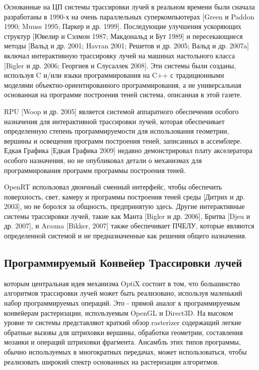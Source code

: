  Основанные на ЦП системы трассировки лучей в реальном времени были сначала разработаны в 1990-х на очень параллельных суперкомпьютерах [Green и Paddon 1990; Muuss 1995; Паркер и др. 1999]. Последующие улучшения ускоряющих структур [Ювелир и Сэлмон 1987; Макдональд и Бут 1989] и пересекающиеся методы [Вальд и др. 2001; Havran 2001; Решетов и др. 2005; Вальд и др. 2007a] включал интерактивную трассировку лучей на машинах настольного класса [Bigler и др. 2006; Георгиев и Слусаллек 2008]. Эти системы были созданы, используя C и/или языки программирования на C++ с традиционными моделями объектно-ориентированного программирования, а не универсальная основанная на программе построения теней система, описанная в этой газете. 
  
  RPU [Woop и др. 2005] является системой аппаратного обеспечения особого назначения для интерактивной трассировки лучей, которая обеспечивает определенную степень программируемости для использования геометрии, вершины и освещения программ построения теней, записанных в ассемблере. Едкая Графика [Едкая Графика 2009] недавно демонстрировал плату акселератора особого назначения, но не опубликовал детали о механизмах для программирования программ программы построения теней.
  
OpenRT использовал двоичный сменный интерфейс, чтобы обеспечить поверхность, свет, камеру и программы построения теней среды [Дитрих и др. 2003], но не боролся за общность, предпринятую здесь. Другие интерактивные системы трассировки лучей, такие как Манта [Bigler и др. 2006], Бритва [Djeu и др. 2007], и Arauna [Bikker, 2007] также обеспечивает ПЧЕЛУ, которые являются определенной системой и не предназначенные как решения общего назначения.

\subsection{Программируемый Конвейер Трассировки лучей}
 которым центральная идея механизма OptiX состоит в том, что большинство алгоритмов трассировки лучей может быть реализовано, используя маленький набор программируемых операций. Это - прямой аналог к программируемым конвейерам растеризации, используемым OpenGL и Direct3D. На высоком уровне те системы представляют краткий обзор rasterizer содержащий легкие обратные вызовы для штриховки вершины, обработки геометрии, составления мозаики и операций штриховки фрагмента. Ансамбль этих типов программы, обычно используемых в многократных передачах, может использоваться, чтобы реализовать широкий спектр основанных на растеризации алгоритмов. 
 
